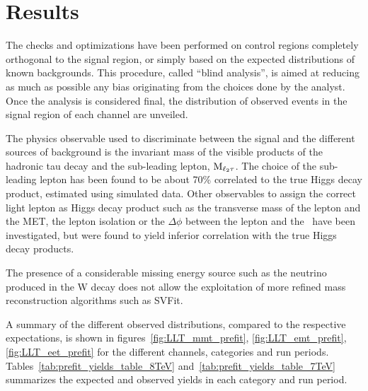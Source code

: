\section{Results}

The checks and optimizations have been performed on control regions completely orthogonal to the signal region, or simply based on the expected distributions of known backgrounds. This procedure, called ``blind analysis'', is aimed at reducing as much as possible any bias originating from the choices done by the analyst. 
Once the analysis is considered final, the distribution of observed events in the signal region of each channel are unveiled. 

The physics observable used to discriminate between the signal and the different sources of background is the invariant mass of the visible products of the hadronic tau decay and the sub-leading lepton, $\rm{M}_{\ell_2 \tau}$. The choice of the sub-leading lepton has been found to be about 70\% correlated to the true Higgs decay product, estimated using simulated data. Other observables to assign the correct light lepton as Higgs decay product such as the transverse mass of the lepton and the MET, the lepton isolation or the $\Delta\phi$ between the lepton and the \MET\ have been investigated, but were found to yield inferior correlation with the true Higgs decay products.

The presence of a considerable missing energy source such as the neutrino produced in the W decay does not allow the exploitation of more refined mass reconstruction algorithms such as SVFit.

A summary of the different observed distributions, compared to the respective expectations, is shown in figures~\ref{fig:LLT_mmt_prefit}, \ref{fig:LLT_emt_prefit}, \ref{fig:LLT_eet_prefit} for the different channels, categories and run periods. Tables~\ref{tab:prefit_yields_table_8TeV} and~\ref{tab:prefit_yields_table_7TeV} summarizes the expected and observed yields in each category and run period.

